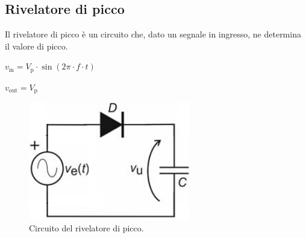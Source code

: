 \documentclass[a4paper]{article}
\begin{document}
		\subsection{Rivelatore di picco}
			Il rivelatore di picco è un circuito che, dato un segnale in ingresso, ne determina il valore di picco.
			\newline
			\begin{center}
				$ v_{\mathrm{in}} = V_{\mathrm{p}} \cdot \sin(2 \pi \cdot f \cdot t) $
			\end{center}
			\newline
			\begin{center}
				$ v_{\mathrm{out}} = V_{\mathrm{p}} $
			\end{center}
			\begin{figure}[h!]
				\centering
				\includegraphics[scale=0.7]{rivelatoreDiPiccoCircuito}
				\caption{Circuito del rivelatore di picco.}
				\label{fig:rivelatoreDiPiccoCircuito}
			\end{figure}
\end{document}
